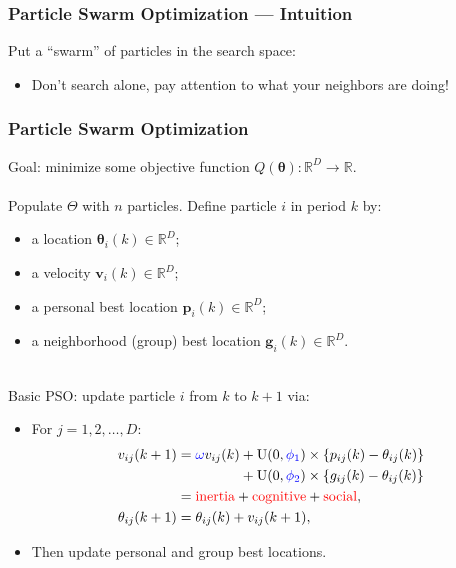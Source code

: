 \documentclass[xcolor=dvipsnames]{beamer}
\begin{document}
\begin{frame}
\frametitle{Particle Swarm Optimization --- Intuition}
\begin{center}
\end{center}
Put a ``swarm'' of particles in the search space:\\
\begin{itemize}
\item[] Don't search alone, pay attention to what your neighbors are doing!
\end{itemize}
\end{frame}

\begin{frame}
\frametitle{Particle Swarm Optimization}
Goal: minimize some objective function $Q(\bm{\theta}): \mathbb{R}^D \to \mathbb{R}$.\\~\\
Populate $\Theta$ with $n$ particles. Define particle $i$ in period $k$ by:
\begin{itemize}
\item a {\color{red}location} \hfill $\bm{\theta}_i(k)\in \mathbb{R}^D$;\hspace{2.5cm}\phantom{.}
\item a {\color{red}velocity} \hfill $\bm{v}_i(k) \in \mathbb{R}^D$;\hspace{2.5cm}\phantom{.}
\item a {\color{red}personal best} location \hfill $\bm{p}_i(k) \in \mathbb{R}^D$;\hspace{2.5cm}\phantom{.} 
\item a {\color{red}neighborhood (group) best} location \hfill $\bm{g}_i(k) \in \mathbb{R}^D$.\hspace{2.5cm}\phantom{.} \\~\\
\end{itemize}

\pause 

Basic PSO: update particle $i$ from $k$ to $k+1$ via: \\
\begin{itemize}
\item  For $j=1,2,\dots,D$:
\begin{align*}
v_{ij}(k+1) &= {\color{blue}\omega} v_{ij}(k) +  \mathrm{U}(0,{\color{blue}\phi_1})\times\{p_{ij}(k) - \theta_{ij}(k)\} \\
     &\;\phantom{= \omega v_{ij}(k)}+  \mathrm{U}(0,{\color{blue}\phi_2})\times\{g_{ij}(k) - \theta_{ij}(k)\}\\
& = \mbox{{\color{red}inertia}} + \mbox{{\color{red}cognitive}} + \mbox{{\color{red}social}},\\
\theta_{ij}(k+1) &= \theta_{ij}(k) + v_{ij}(k+1),
\end{align*}
\item Then update personal and group best locations.
\end{itemize}
\end{frame}
\end{document}
